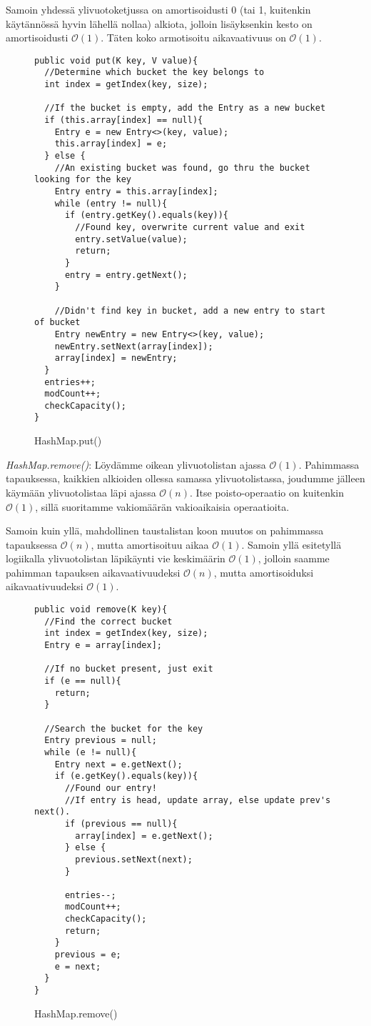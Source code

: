 \documentclass[12pt,a4paper]{article}
\begin{document}
Samoin yhdessä ylivuotoketjussa on amortisoidusti 0 (tai 1, kuitenkin käytännössä hyvin lähellä nollaa) alkiota, jolloin lisäyksenkin kesto on amortisoidusti $\mathcal{O}(1)$. Täten koko armotisoitu aikavaativuus on $\mathcal{O}(1)$.
\begin{figure}[H]
\begin{lstlisting}
public void put(K key, V value){   
  //Determine which bucket the key belongs to
  int index = getIndex(key, size);
        
  //If the bucket is empty, add the Entry as a new bucket
  if (this.array[index] == null){
    Entry e = new Entry<>(key, value);
    this.array[index] = e;    
  } else {
    //An existing bucket was found, go thru the bucket looking for the key
    Entry entry = this.array[index];
    while (entry != null){
      if (entry.getKey().equals(key)){
        //Found key, overwrite current value and exit
        entry.setValue(value);
        return;
      }
      entry = entry.getNext();
    }
            
    //Didn't find key in bucket, add a new entry to start of bucket
    Entry newEntry = new Entry<>(key, value);
    newEntry.setNext(array[index]);
    array[index] = newEntry;
  }
  entries++;
  modCount++;
  checkCapacity();
}
\end{lstlisting}
\caption{HashMap.put()}
\end{figure}

\textit{HashMap.remove()}: Löydämme oikean ylivuotolistan ajassa $\mathcal{O}(1)$. Pahimmassa tapauksessa, kaikkien alkioiden ollessa samassa ylivuotolistassa, joudumme jälleen käymään ylivuotolistaa läpi ajassa $\mathcal{O}(n)$. Itse poisto-operaatio on kuitenkin $\mathcal{O}(1)$, sillä suoritamme vakiomäärän vakioaikaisia operaatioita.

Samoin kuin yllä, mahdollinen taustalistan koon muutos on pahimmassa tapauksessa $\mathcal{O}(n)$, mutta amortisoituu aikaa $\mathcal{O}(1)$. Samoin yllä esitetyllä logiikalla ylivuotolistan läpikäynti vie keskimäärin $\mathcal{O}(1)$, jolloin saamme pahimman tapauksen aikavaativuudeksi $\mathcal{O}(n)$, mutta amortisoiduksi aikavaativuudeksi $\mathcal{O}(1)$.
\begin{figure}[H]
\begin{lstlisting}
public void remove(K key){
  //Find the correct bucket
  int index = getIndex(key, size);
  Entry e = array[index];
        
  //If no bucket present, just exit
  if (e == null){
    return;
  }
        
  //Search the bucket for the key
  Entry previous = null;
  while (e != null){
    Entry next = e.getNext();
    if (e.getKey().equals(key)){
      //Found our entry!
      //If entry is head, update array, else update prev's next().
      if (previous == null){
        array[index] = e.getNext();
      } else {
        previous.setNext(next);
      }
                
      entries--;
      modCount++;
      checkCapacity();
      return;
    }
    previous = e;
    e = next;
  }
}
\end{lstlisting}
\caption{HashMap.remove()}
\end{figure}
\end{document}
